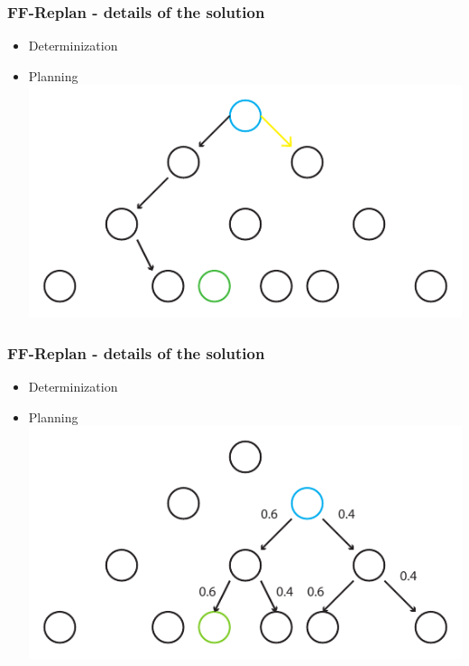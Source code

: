 \documentclass{beamer}
\let\origframetitle=\frametitle
\renewcommand\frametitle[1]{\origframetitle{\textbf{\large{\textrm{#1}}}}}
\begin{document}
\begin{frame}
  \frametitle{FF-Replan - details of the solution}

  \begin{itemize}
    \item Determinization
    \item Planning
 \includegraphics[width=\textwidth]{images/replan3.pdf}
   \end{itemize}
\end{frame}

\begin{frame}
  \frametitle{FF-Replan - details of the solution}

  \begin{itemize}
    \item Determinization
    \item Planning
 \includegraphics[width=\textwidth]{images/replan4.pdf}
   \end{itemize}
\end{frame}
\end{document}
